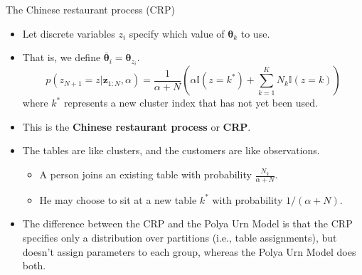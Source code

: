 \documentclass[10pt,mathserif]{beamer}
\begin{document}
\begin{frame}{The Chinese restaurant process (CRP)}
\begin{itemize}
    \item Let discrete variables $z_i$ specify which value of $\bm{\theta}_k$ to use.
    \item That is, we define $\bar{\bm{\theta}}_i = \bm{\theta}_{z_i}$.
    \begin{equation*}
        p(z_{N+1} =z|\bm{z}_{1:N},\alpha)= \frac{1}{\alpha+N} (\alpha \mathbb{I}(z=k^*)+ \sum_{k=1}^K N_k \mathbb{I} (z=k) )
    \end{equation*}
    where $k^*$ represents a new cluster index that has not yet been used.
    \item This is the \textbf{Chinese restaurant process} or \textbf{CRP}.
    \item The tables are like clusters, and the customers are like observations.
    \begin{itemize}
        \item A person joins an existing table with probability $\frac{N_k}{\alpha+N}$.
        \item He may choose to sit at a new table $k^*$ with probability $1/(\alpha + N )$.
    \end{itemize}
    \item The difference between the CRP and the Polya Urn Model is that the CRP specifies only a distribution over partitions (i.e., table assignments), but doesn't assign parameters to each group, whereas the Polya Urn Model does both.
\end{itemize}    
\end{frame}
\end{document}

